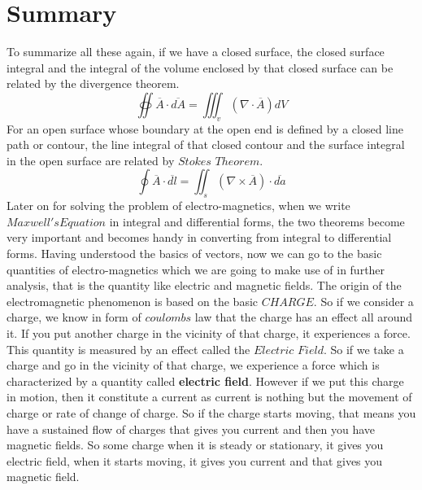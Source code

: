 \section{Summary}
To summarize all these again, if we have a closed surface, the closed surface integral and the integral of the volume enclosed by that closed surface can be related by the divergence theorem.
\begin{equation}
\oiint \overline{A}\cdot\overline{dA} = \iiint_v(\nabla\cdot\overline{A})dV
\end{equation}
For an open surface whose boundary at the open end is defined by a closed line path or contour, the line integral of that closed contour and the surface integral in the open surface are related by $Stokes$ $Theorem$.
\begin{equation}
\oint\overline{A}\cdot\overline{dl} = \iint_s(\nabla\times\overline{A})\cdot\overline{da}
\end{equation}	
Later on for solving the problem of electro-magnetics, when we write $Maxwell's Equation$ in integral and differential forms, the two theorems become very important and becomes handy in converting from integral to differential forms. Having understood the basics of vectors, now we can go to the basic quantities of electro-magnetics which we are going to make use of in further analysis, that is the quantity like electric and magnetic fields.\newline
The origin of the electromagnetic phenomenon is based on the basic $CHARGE$. So if we consider a charge, we know in form of $coulombs$ law that the charge has an effect all around it. If you put another charge in the vicinity of that charge, it experiences a force. This quantity is measured by an effect called the $Electric$ $Field$.
So if we take a charge and go in the vicinity of that charge, we experience a force which is characterized by a quantity called \textbf{electric field}. However if we put this charge in motion, then it constitute a current as current is nothing but the movement of charge or rate of change of charge.\newline
So if the charge starts moving, that means you have a sustained flow of charges that gives you current and then you have magnetic fields. So some charge when it is steady or stationary, it gives you electric field, when it starts moving, it gives you current and that gives you magnetic field.\newline
